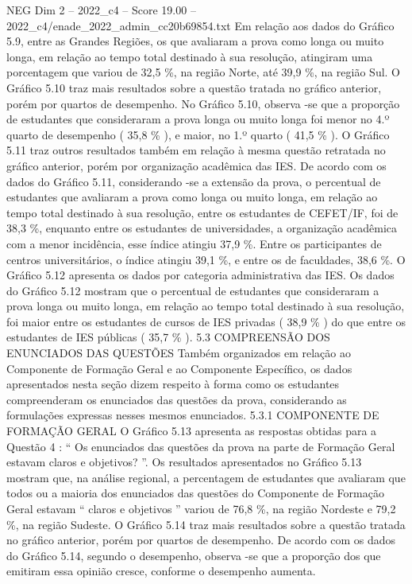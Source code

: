 \begin{textsample}{NEG Dim 2 – 2022\_c4 – Score 19.00 – 2022\_c4/enade\_2022\_admin\_cc20b69854.txt}
Em relação aos dados do Gráfico 5.9, entre as Grandes Regiões, os que avaliaram a prova como longa ou muito longa, em relação ao tempo total destinado à sua resolução, atingiram uma porcentagem que variou de 32,5 \%, na região Norte, até 39,9 \%, na região Sul.
O Gráfico 5.10 traz mais resultados sobre a questão tratada no gráfico anterior, porém por quartos de desempenho.
No Gráfico 5.10, observa -se que a proporção de estudantes que consideraram a prova longa ou muito longa foi menor no 4.º quarto de desempenho ( 35,8 \% ), e maior, no 1.º quarto ( 41,5 \% ).
O Gráfico 5.11 traz outros resultados também em relação à mesma questão retratada no gráfico anterior, porém por organização acadêmica das IES.
De acordo com os dados do Gráfico 5.11, considerando -se a extensão da prova, o percentual de estudantes que avaliaram a prova como longa ou muito longa, em relação ao tempo total destinado à sua resolução, entre os estudantes de CEFET/IF, foi de 38,3 \%, enquanto entre os estudantes de universidades, a organização acadêmica com a menor incidência, esse índice atingiu 37,9 \%.
Entre os participantes de centros universitários, o índice atingiu 39,1 \%, e entre os de faculdades, 38,6 \%.
O Gráfico 5.12 apresenta os dados por categoria administrativa das IES.
Os dados do Gráfico 5.12 mostram que o percentual de estudantes que consideraram a prova longa ou muito longa, em relação ao tempo total destinado à sua resolução, foi maior entre os estudantes de cursos de IES privadas ( 38,9 \% ) do que entre os estudantes de IES públicas ( 35,7 \% ). 5.3 COMPREENSÃO DOS ENUNCIADOS DAS QUESTÕES Também organizados em relação ao Componente de Formação Geral e ao Componente Específico, os dados apresentados nesta seção dizem respeito à forma como os estudantes compreenderam os enunciados das questões da prova, considerando as formulações expressas nesses mesmos enunciados. 5.3.1 COMPONENTE DE FORMAÇÃO GERAL O Gráfico 5.13 apresenta as respostas obtidas para a Questão 4 : “ Os enunciados das questões da prova na parte de Formação Geral estavam claros e objetivos? ”.
Os resultados apresentados no Gráfico 5.13 mostram que, na análise regional, a percentagem de estudantes que avaliaram que todos ou a maioria dos enunciados das questões do Componente de Formação Geral estavam “ claros e objetivos ” variou de 76,8 \%, na região Nordeste e 79,2 \%, na região Sudeste.
O Gráfico 5.14 traz mais resultados sobre a questão tratada no gráfico anterior, porém por quartos de desempenho.
De acordo com os dados do Gráfico 5.14, segundo o desempenho, observa -se que a proporção dos que emitiram essa opinião cresce, conforme o desempenho aumenta.

\end{textsample}
